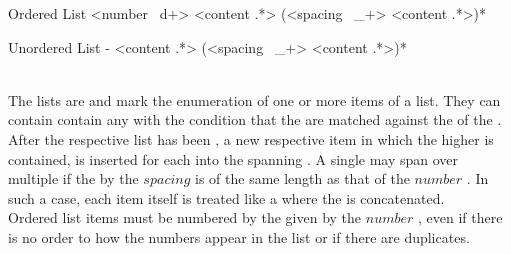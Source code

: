 \begin{identifier}{Ordered List}
<number ~d+> <content .*>
(<spacing ~_+> <content .*>)*
\end{identifier}
\begin{identifier}{Unordered List}
- <content .*>
(<spacing ~_+> <content .*>)*
\end{identifier}
 \\

The lists are  and mark the enumeration of one or more items of a list. They can contain contain any  with the condition that the  are matched against the  of the . \\

After the respective list  has been , a new respective item  in which the higher   is contained, is inserted for each  into the spanning . A single  may span over multiple  if the   by the \inline$spacing$  is of the same length as that of the \inline$number$ . In such a case, each item  itself is treated like a  where the  is concatenated. \\

Ordered list items must be numbered by the  given by the \inline$number$ , even if there is no order to how the numbers appear in the list or if there are duplicates. \\

